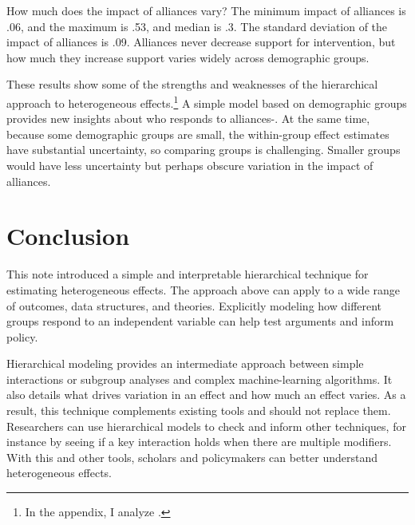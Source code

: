 \documentclass[12pt]{article}
\begin{document}
How much does the impact of alliances vary?
The minimum impact of alliances is .06, and the maximum is .53, and median is .3. 
The standard deviation of the impact of alliances is .09. 
Alliances never decrease support for intervention, but how much they increase support varies widely across demographic groups. 


These results show some of the strengths and weaknesses of the hierarchical approach to heterogeneous effects.\footnote{In the appendix, I analyze \citet{BushPrather2020}.}
A simple model based on demographic groups provides new insights about who responds to alliances-. 
At the same time, because some demographic groups are small, the within-group effect estimates have substantial uncertainty, so comparing groups is challenging. 
Smaller groups would have less uncertainty but perhaps obscure variation in the impact of alliances. 


\section{Conclusion}

This note introduced a simple and interpretable hierarchical technique for estimating heterogeneous effects. 
The approach above can apply to a wide range of outcomes, data structures, and theories. 
Explicitly modeling how different groups respond to an independent variable can help test arguments and inform policy.  


Hierarchical modeling provides an intermediate approach between simple interactions or subgroup analyses and complex machine-learning algorithms. 
It also details what drives variation in an effect and how much an effect varies. 
As a result, this technique complements existing tools and should not replace them. 
Researchers can use hierarchical models to check and inform other techniques, for instance by seeing if a key interaction holds when there are multiple modifiers. 
With this and other tools, scholars and policymakers can better understand heterogeneous effects.


\singlespace
 


%
\end{document}
